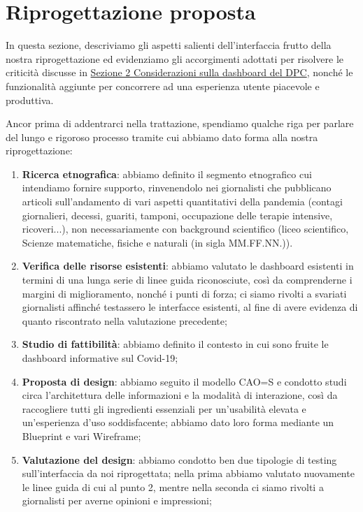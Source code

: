\documentclass[../../main.tex]{subfiles}
\begin{document}
\section{Riprogettazione proposta}
In questa sezione, descriviamo gli aspetti salienti dell'interfaccia frutto della nostra riprogettazione ed evidenziamo gli accorgimenti adottati per risolvere le criticità discusse in \hyperref[s:considerazioni]{Sezione 2 Considerazioni sulla dashboard del DPC}, nonché le funzionalità aggiunte per concorrere ad una esperienza utente piacevole e produttiva.

Ancor prima di addentrarci nella trattazione, spendiamo qualche riga per parlare del lungo e  rigoroso processo tramite cui abbiamo dato forma alla nostra riprogettazione:
\begin{enumerate}
    \item \textbf{Ricerca etnografica}: abbiamo definito il segmento etnografico cui intendiamo fornire supporto, rinvenendolo nei giornalisti che pubblicano articoli sull'andamento di vari aspetti quantitativi della pandemia (contagi giornalieri, decessi, guariti, tamponi, occupazione delle terapie intensive, ricoveri...), non necessariamente con background scientifico (liceo scientifico, Scienze matematiche, fisiche e naturali (in sigla MM.FF.NN.)).
    \item \textbf{Verifica delle risorse esistenti}: abbiamo valutato le dashboard esistenti in termini di una lunga serie di linee guida riconosciute, così da comprenderne i margini di miglioramento, nonché i punti di forza; ci siamo rivolti a svariati giornalisti affinché testassero le interfacce esistenti, al fine di avere evidenza di quanto riscontrato nella valutazione precedente;
    \item \textbf{Studio di fattibilità}: abbiamo definito il contesto in cui sono fruite le dashboard informative sul Covid-19;
    \item \textbf{Proposta di design}: abbiamo seguito il modello CAO=S e condotto studi circa l'architettura delle informazioni e la modalità di interazione, così da raccogliere tutti gli ingredienti essenziali per un'usabilità elevata e un'esperienza d'uso soddisfacente; abbiamo dato  loro forma mediante un Blueprint e vari Wireframe;
    \item \textbf{Valutazione del design}: abbiamo condotto ben due tipologie di testing sull'interfaccia da noi riprogettata; nella prima abbiamo valutato nuovamente le linee guida di cui al punto 2, mentre nella seconda ci siamo rivolti a giornalisti per averne opinioni e impressioni;
\end{enumerate}
\end{document}
